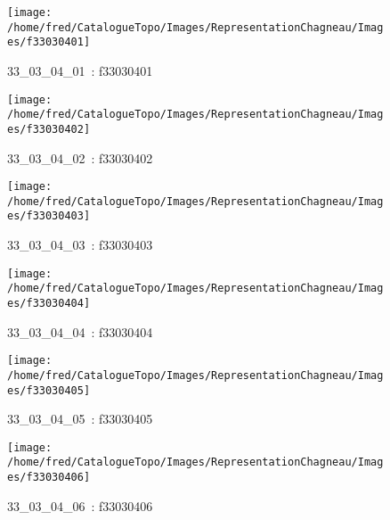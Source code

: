 \documentclass[12pt,titlepage]{book}
\begin{document}
\begin{figure}[h!]
  \hfill         %
  \begin{minipage}[t]{3cm}
    \begin{center}
      \texttt{[image: /home/fred/CatalogueTopo/Images/RepresentationChagneau/Images/f33030401]}
      \caption[~33\_03\_04\_01]{\small{33\_03\_04\_01~:} \tiny{f33030401}}\label{f33030401}
    \end{center}
  \end{minipage}
  \begin{minipage}[t]{3cm}
    \begin{center}
      \texttt{[image: /home/fred/CatalogueTopo/Images/RepresentationChagneau/Images/f33030402]}
      \caption[~33\_03\_04\_02]{\small{33\_03\_04\_02~:} \tiny{f33030402}}\label{f33030402}
    \end{center}
  \end{minipage}
  \begin{minipage}[t]{3cm}
    \begin{center}
      \texttt{[image: /home/fred/CatalogueTopo/Images/RepresentationChagneau/Images/f33030403]}
      \caption[~33\_03\_04\_03]{\small{33\_03\_04\_03~:} \tiny{f33030403}}\label{f33030403}
    \end{center}
  \end{minipage}
  \begin{minipage}[t]{3cm}
    \begin{center}
      \texttt{[image: /home/fred/CatalogueTopo/Images/RepresentationChagneau/Images/f33030404]}
      \caption[~33\_03\_04\_04]{\small{33\_03\_04\_04~:} \tiny{f33030404}}\label{f33030404}
    \end{center}
  \end{minipage}
  \begin{minipage}[t]{3cm}
    \begin{center}
      \texttt{[image: /home/fred/CatalogueTopo/Images/RepresentationChagneau/Images/f33030405]}
      \caption[~33\_03\_04\_05]{\small{33\_03\_04\_05~:} \tiny{f33030405}}\label{f33030405}
    \end{center}
  \end{minipage}
  \begin{minipage}[t]{3cm}
    \begin{center}
      \texttt{[image: /home/fred/CatalogueTopo/Images/RepresentationChagneau/Images/f33030406]}
      \caption[~33\_03\_04\_06]{\small{33\_03\_04\_06~:} \tiny{f33030406}}\label{f33030406}
    \end{center}
  \end{minipage}
\end{figure}
\end{document}
